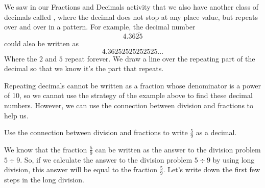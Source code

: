 \documentclass{ximera}
\begin{document}
We saw in our Fractions and Decimals activity that we also have another class of decimals called , where the decimal does not stop at any place value, but repeats over and over in a pattern. For example, the decimal number
\[
4.36\overline{25}
\]
could also be written as
\[
4.36252525252525\dots
\]
Where the $2$ and $5$ repeat forever. We draw a line over the repeating part of the decimal so that we know it's the part that repeats.

Repeating decimals cannot be written as a fraction whose denominator is a power of 10, so we cannot use the strategy of the example above to find these decimal numbers. However, we can use the connection between division and fractions to help us.

\begin{example}
Use the connection between division and fractions to write $\frac{5}{9}$ as a decimal. 

We know that the fraction $\frac{5}{9}$ can be written as the answer to the division problem $5 \div 9$. So, if we calculate the answer to the division problem $5 \div 9$ by using long division, this answer will be equal to the fraction $\frac{5}{9}$. Let's write down the first few steps in the long division.

\begin{image}
\end{image}
\end{example}
\end{document}
